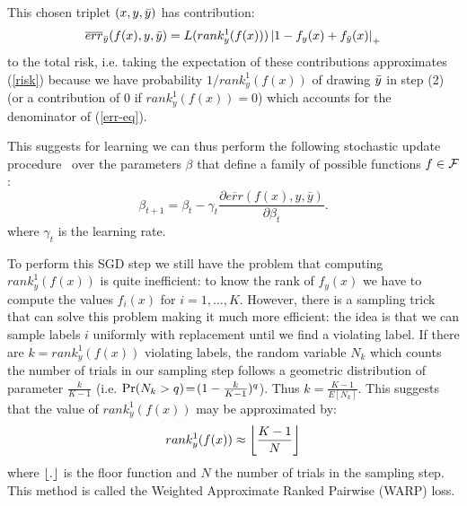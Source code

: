 This chosen triplet $(x,y,{\bar{y}})$ has contribution:
\begin{equation}
\label{eq-err}
\overline{err}_{{\bar{y}}}(f(x),y,{\bar{y}}) = {L}(rank^1_y(f(x))) \left |1 - f_y(x)+ f_{\bar{y}}(x)\right|_+
\end{equation}
to the total risk, i.e. taking the expectation of these contributions
approximates (\ref{risk}) because we have  probability 
$1/rank^1_{y}(f(x))$ of drawing ${\bar{y}}$ in step (2) (or a contribution of 0 if 
$rank^1_{y}(f(x))=0$) which accounts for
the denominator of (\ref{err-eq}).

This suggests for learning we can thus perform the following stochastic update procedure~\cite{robbins_monro:1951} over the parameters $\beta$
 that define a family of possible functions $f \in {\cal F}$:
\begin{equation}
\label{eq:sgdstep}
\beta_{t+1} = \beta_t - \gamma_t \frac{\partial \overline{err}(f(x),y,\bar{y})}{\partial \beta_t}.
\end{equation}
where $\gamma_t$ is the learning rate.
\fi 

To perform this SGD step we still have the problem that computing  $rank^1_y(f(x))$  is quite inefficient:
to know the rank of $f_y(x)$ we have to compute the values $f_i(x)$ for  $i=1,\dots,K$.
However, there is a sampling trick that can solve this problem making it much more efficient:
the idea is that we can sample labels $i$ uniformly with replacement until we find a violating label. 
If there are $k=rank^1_y(f(x))$ violating labels, the random
variable $N_k$ which counts the number of trials in our sampling step
follows a geometric distribution of parameter $\frac{k}{K-1}$
(i.e. $\text{Pr}(N_k > q)\! =\!  (1-\frac{k}{K-1})^q$). Thus
$k=\frac{K-1}{E[N_k]}$. This suggests that the value of $rank^1_y(f(x))$
 may be approximated by:
$$rank^1_y(f(x)) \approx \left \lfloor \frac{K-1}{N} \right \rfloor$$
where $\left \lfloor . \right \rfloor$ is the floor function and $N$ the number of trials
in the sampling step.
This method is called the Weighted Approximate Ranked Pairwise (WARP) loss.

